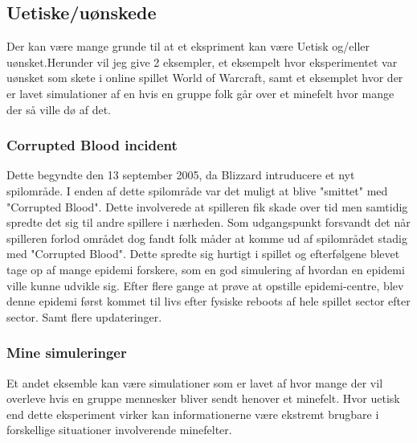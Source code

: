 \subsection{Uetiske/uønskede}
Der kan være mange grunde til at et ekspriment kan være Uetisk og/eller uønsket.Herunder vil jeg give 2 eksempler, et eksempelt hvor eksperimentet var uønsket som skete i online spillet World of Warcraft, samt et eksemplet hvor der er lavet simulationer af en hvis en gruppe folk går over et minefelt hvor mange der så ville dø af det.
\subsubsection{Corrupted Blood incident}
Dette begyndte den 13 september 2005, da Blizzard intruducere et nyt spilområde.
I enden af dette spilområde var det muligt at blive "smittet" med "Corrupted Blood". Dette involverede at spilleren fik skade over tid men samtidig spredte det sig til andre spillere i nærheden.
Som udgangspunkt forsvandt det når spilleren forlod området dog fandt folk måder at komme ud af spilområdet stadig med "Corrupted Blood".
Dette spredte sig hurtigt i spillet og efterfølgene blevet tage op af mange epidemi forskere,  som en god simulering af hvordan en epidemi ville kunne udvikle sig. Efter flere gange at prøve at opstille epidemi-centre, blev denne epidemi først kommet til livs efter fysiske reboots af hele spillet sector efter sector. Samt flere updateringer. 
\subsubsection{Mine simuleringer}
Et andet eksemble kan være simulationer som er lavet af hvor mange der vil overleve hvis en gruppe mennesker bliver sendt henover et minefelt. Hvor uetisk end dette eksperiment virker kan informationerne være ekstremt brugbare i forskellige situationer involverende minefelter.
